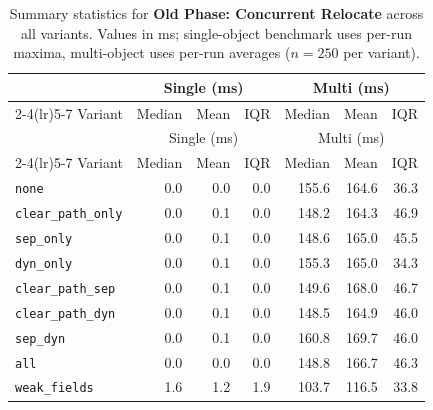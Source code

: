 \begin{longtable}{l rrr rrr}
\caption[Old Phase: Concurrent Relocate summary statistics]{Summary statistics for \textbf{Old Phase: Concurrent Relocate} across all variants. Values in ms; single-object benchmark uses per-run maxima, multi-object uses per-run averages ($n=250$ per variant).}\label{tab:stats-old-relocate} \\
\toprule
 & \multicolumn{3}{c}{Single (ms)} & \multicolumn{3}{c}{Multi (ms)} \\
\cmidrule(lr){2-4}\cmidrule(lr){5-7}
Variant & Median & Mean & IQR & Median & Mean & IQR \\
\midrule
\endfirsthead
\toprule
 & \multicolumn{3}{c}{Single (ms)} & \multicolumn{3}{c}{Multi (ms)} \\
\cmidrule(lr){2-4}\cmidrule(lr){5-7}
Variant & Median & Mean & IQR & Median & Mean & IQR \\
\midrule
\endhead
\bottomrule
\endfoot
\texttt{none} & 0.0 & 0.0 & 0.0 & 155.6 & 164.6 & 36.3 \\
\texttt{clear\_path\_only} & 0.0 & 0.1 & 0.0 & 148.2 & 164.3 & 46.9 \\
\texttt{sep\_only} & 0.0 & 0.1 & 0.0 & 148.6 & 165.0 & 45.5 \\
\texttt{dyn\_only} & 0.0 & 0.1 & 0.0 & 155.3 & 165.0 & 34.3 \\
\texttt{clear\_path\_sep} & 0.0 & 0.1 & 0.0 & 149.6 & 168.0 & 46.7 \\
\texttt{clear\_path\_dyn} & 0.0 & 0.1 & 0.0 & 148.5 & 164.9 & 46.0 \\
\texttt{sep\_dyn} & 0.0 & 0.1 & 0.0 & 160.8 & 169.7 & 46.0 \\
\texttt{all} & 0.0 & 0.0 & 0.0 & 148.8 & 166.7 & 46.3 \\
\texttt{weak\_fields} & 1.6 & 1.2 & 1.9 & 103.7 & 116.5 & 33.8 \\
\end{longtable}
